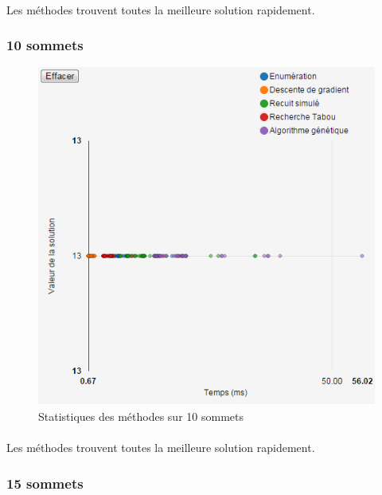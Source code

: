 \documentclass[12pt]{article}
\begin{document}
\paragraph{} Les méthodes trouvent toutes la meilleure solution rapidement.

\subsubsection{10 sommets}

\begin{figure}[H]
	\begin{center}
	\includegraphics[scale=0.5]{pictures/results/10sommets.png}
	\end{center}
	\caption{Statistiques des méthodes sur 10 sommets \label{fig:10nodeResult}}
\end{figure}
\paragraph{} Les méthodes trouvent toutes la meilleure solution rapidement.

\subsubsection{15 sommets}
\end{document}
